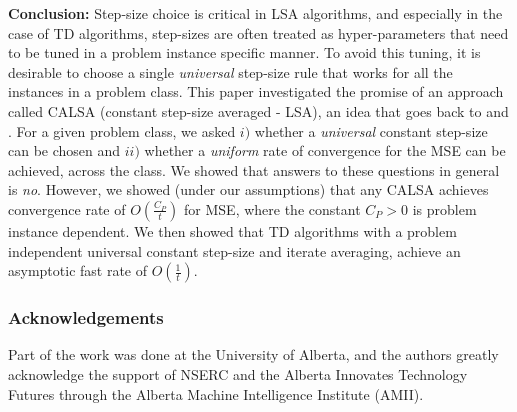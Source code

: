 \textbf{Conclusion:} 
Step-size choice is critical in LSA algorithms, and especially in the case of TD algorithms, step-sizes are often treated as hyper-parameters that need to be tuned in a problem instance specific manner. To avoid this tuning, it is desirable to choose a single \emph{universal} step-size rule that works for all the instances in a problem class. This paper investigated the promise of an approach called CALSA (constant step-size averaged - LSA), an idea that goes back to \citet{ruppert} and \citet{polyak-judisky}. For a given problem class, we asked $i)$ whether a \emph{universal} constant step-size can be chosen and $ii)$ whether a \emph{uniform} rate of convergence for the MSE can be achieved, across the class. We showed that answers to these questions in general is \emph{no}. However, we showed (under our assumptions) that any CALSA achieves convergence rate of $O(\frac{C_P}{t})$ for MSE, where the constant $C_P>0$ is problem instance dependent. We then showed that TD algorithms with a problem independent universal constant step-size and iterate averaging, achieve an asymptotic fast rate of $O(\frac{1}{t})$. 
\subsubsection*{Acknowledgements}
Part of the work was done at the University of Alberta, and the authors greatly acknowledge the
support of NSERC and the Alberta Innovates Technology
Futures through the Alberta Machine Intelligence
Institute (AMII).
